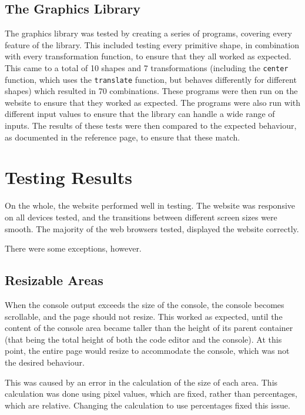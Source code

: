 \documentclass[../main.tex]{subfiles}
\begin{document}
        \subsection{The Graphics Library}
            The graphics library was tested by creating a series of programs, covering
                every feature of the library.
            This included testing every primitive shape, in combination with every
                transformation function, to ensure that they all worked as expected.
            This came to a total of 10 shapes and 7 transformations (including the
                \texttt{center} function, which uses the \texttt{translate} function, but
                behaves differently for different shapes) which resulted in 70 combinations.
            These programs were then run on the website to ensure that they worked as
                expected.
            The programs were also run with different input values to ensure that the
                library can handle a wide range of inputs.
            The results of these tests were then compared to the expected behaviour, as
                documented in the reference page, to ensure that these match.

    \section{Testing Results}
        On the whole, the website performed well in testing.
        The website was responsive on all devices tested, and the transitions between
            different screen sizes were smooth.
        The majority of the web browsers tested, displayed the website correctly.

        There were some exceptions, however.

        \subsection{Resizable Areas}
            When the console output exceeds the size of the console, the console becomes
                scrollable, and the page should not resize.
            This worked as expected, until the content of the console area became taller
                than the height of its parent container (that being the total height of both
                the code editor and the console).
            At this point, the entire page would resize to accommodate the console, which
                was not the desired behaviour.

            This was caused by an error in the calculation of the size of each area.
            This calculation was done using pixel values, which are fixed, rather than
                percentages, which are relative.
            Changing the calculation to use percentages fixed this issue.
\end{document}
